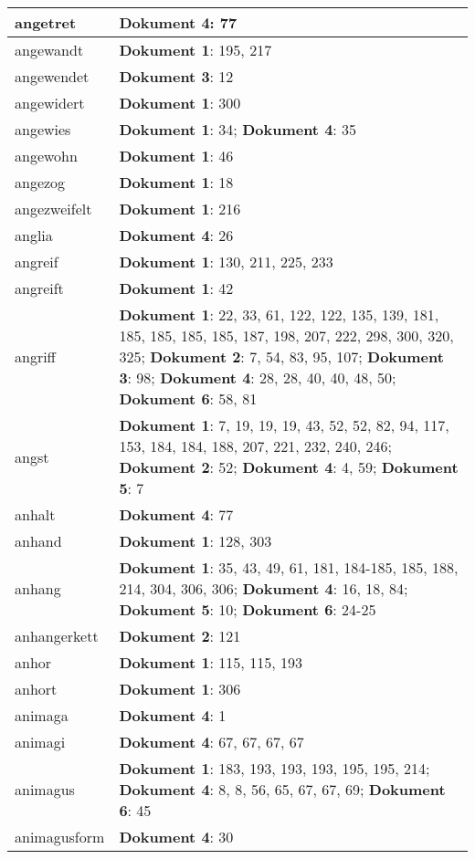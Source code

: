 \documentclass[a5paper]{article}
\begin{document}
\begin{longtable}[l]{|l|p{3in}|}
\hline
angetret & \textbf{Dokument 4}: 77 \\
\hline
angewandt & \textbf{Dokument 1}: 195, 217 \\
\hline
angewendet & \textbf{Dokument 3}: 12 \\
\hline
angewidert & \textbf{Dokument 1}: 300 \\
\hline
angewies & \textbf{Dokument 1}: 34; \textbf{Dokument 4}: 35 \\
\hline
angewohn & \textbf{Dokument 1}: 46 \\
\hline
angezog & \textbf{Dokument 1}: 18 \\
\hline
angezweifelt & \textbf{Dokument 1}: 216 \\
\hline
anglia & \textbf{Dokument 4}: 26 \\
\hline
angreif & \textbf{Dokument 1}: 130, 211, 225, 233 \\
\hline
angreift & \textbf{Dokument 1}: 42 \\
\hline
angriff & \textbf{Dokument 1}: 22, 33, 61, 122, 122, 135, 139, 181, 185, 185, 185, 185, 187, 198, 207, 222, 298, 300, 320, 325; \textbf{Dokument 2}: 7, 54, 83, 95, 107; \textbf{Dokument 3}: 98; \textbf{Dokument 4}: 28, 28, 40, 40, 48, 50; \textbf{Dokument 6}: 58, 81 \\
\hline
angst & \textbf{Dokument 1}: 7, 19, 19, 19, 43, 52, 52, 82, 94, 117, 153, 184, 184, 188, 207, 221, 232, 240, 246; \textbf{Dokument 2}: 52; \textbf{Dokument 4}: 4, 59; \textbf{Dokument 5}: 7 \\
\hline
anhalt & \textbf{Dokument 4}: 77 \\
\hline
anhand & \textbf{Dokument 1}: 128, 303 \\
\hline
anhang & \textbf{Dokument 1}: 35, 43, 49, 61, 181, 184-185, 185, 188, 214, 304, 306, 306; \textbf{Dokument 4}: 16, 18, 84; \textbf{Dokument 5}: 10; \textbf{Dokument 6}: 24-25 \\
\hline
anhangerkett & \textbf{Dokument 2}: 121 \\
\hline
anhor & \textbf{Dokument 1}: 115, 115, 193 \\
\hline
anhort & \textbf{Dokument 1}: 306 \\
\hline
animaga & \textbf{Dokument 4}: 1 \\
\hline
animagi & \textbf{Dokument 4}: 67, 67, 67, 67 \\
\hline
animagus & \textbf{Dokument 1}: 183, 193, 193, 193, 195, 195, 214; \textbf{Dokument 4}: 8, 8, 56, 65, 67, 67, 69; \textbf{Dokument 6}: 45 \\
\hline
animagusform & \textbf{Dokument 4}: 30 \\

\end{longtable}
\end{document}

